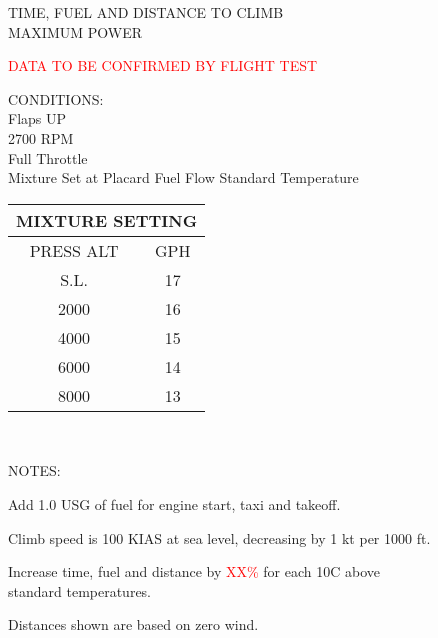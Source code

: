 \begin{figure}[t]
\begin{center}
\begin{perfhdr}TIME, FUEL AND DISTANCE TO CLIMB\\
MAXIMUM POWER\\
\end{perfhdr}
\Large
\textcolor{red}{DATA TO BE CONFIRMED BY FLIGHT TEST}\normalsize \vspace{5ex} \\
\begin{minipage}{4in}
  \begin{flushleft}
    CONDITIONS:\\
    Flaps UP\\
    2700 RPM\\
    Full Throttle\\
    Mixture Set at Placard Fuel Flow
    Standard Temperature\\

    \end{flushleft}
\end{minipage}
\hfill
\begin{minipage}{1.5in}
  \begin{tabular}{|c|c|}
    \hline
    \multicolumn{2}{|c|}{MIXTURE SETTING}\\
    \hline
    PRESS ALT&GPH\\
    \hline
    S.L.&17\\
    2000&16\\
    4000&15\\
    6000&14\\
    8000&13\\
    \hline
    \end{tabular}
  \end{minipage}
\\
\vspace{\perfnoteskip}
    \raggedright NOTES:
    \begin{enumerate*}
      \item Add 1.0 USG of fuel for engine start, taxi and takeoff.
      \item Climb speed is 100 KIAS at sea level, decreasing by 1 kt per 1000 ft.
      \item Increase time, fuel and distance by \textcolor{red}{XX\%} for each 10\textdegree C above standard
      temperatures.
      \item Distances shown are based on zero wind.
      \end{enumerate*}


\end{center}
\end{figure}
